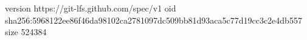 version https://git-lfs.github.com/spec/v1
oid sha256:5968122ee86f46da98102ca2781097dc509bb81d93aca5c77d19cc3c2e4db557
size 524384
